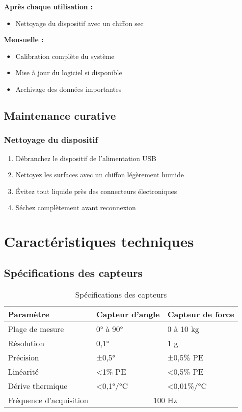 \documentclass[12pt,a4paper]{article}
\begin{document}
\textbf{Après chaque utilisation :}
\begin{itemize}
    \item Nettoyage du dispositif avec un chiffon sec
\end{itemize}

\textbf{Mensuelle :}
\begin{itemize}
    \item Calibration complète du système
    \item Mise à jour du logiciel si disponible
    \item Archivage des données importantes
\end{itemize}

\subsection{Maintenance curative}

\subsubsection{Nettoyage du dispositif}

\begin{enumerate}
    \item Débranchez le dispositif de l'alimentation USB
    \item Nettoyez les surfaces avec un chiffon légèrement humide
    \item Évitez tout liquide près des connecteurs électroniques
    \item Séchez complètement avant reconnexion
\end{enumerate}

\section{Caractéristiques techniques}

\subsection{Spécifications des capteurs}

\begin{table}[H]
\centering
\begin{tabular}{|l|l|l|}
\hline
\textbf{Paramètre} & \textbf{Capteur d'angle} & \textbf{Capteur de force} \\
\hline
Plage de mesure & 0° à 90° & 0 à 10 kg \\
\hline
Résolution & 0,1° & 1 g \\
\hline
Précision & ±0,5° & ±0,5\% PE \\
\hline
Linéarité & <1\% PE & <0,5\% PE \\
\hline
Dérive thermique & <0,1°/°C & <0,01\%/°C \\
\hline
Fréquence d'acquisition & \multicolumn{2}{|c|}{100 Hz} \\
\hline
\end{tabular}
\caption{Spécifications des capteurs}
\label{tab:specs_capteurs}
\end{table}
\end{document}
